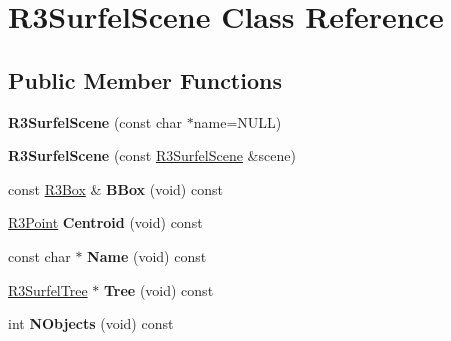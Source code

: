\hypertarget{class_r3_surfel_scene}{}\section{R3\+Surfel\+Scene Class Reference}
\label{class_r3_surfel_scene}
\subsection*{Public Member Functions}
\begin{DoxyCompactItemize}
\item 
{\bfseries R3\+Surfel\+Scene} (const char $\ast$name=N\+U\+LL)\hypertarget{class_r3_surfel_scene_a71cdf9f385093b44b2c3a752dd03eff1}{}\label{class_r3_surfel_scene_a71cdf9f385093b44b2c3a752dd03eff1}

\item 
{\bfseries R3\+Surfel\+Scene} (const \hyperlink{class_r3_surfel_scene}{R3\+Surfel\+Scene} \&scene)\hypertarget{class_r3_surfel_scene_a8f501256ddf0b017856d8916af9d0bcb}{}\label{class_r3_surfel_scene_a8f501256ddf0b017856d8916af9d0bcb}

\item 
const \hyperlink{class_r3_box}{R3\+Box} \& {\bfseries B\+Box} (void) const \hypertarget{class_r3_surfel_scene_aef52657a0cec8dbfd37fb4bb65a5a875}{}\label{class_r3_surfel_scene_aef52657a0cec8dbfd37fb4bb65a5a875}

\item 
\hyperlink{class_r3_point}{R3\+Point} {\bfseries Centroid} (void) const \hypertarget{class_r3_surfel_scene_a4047a286060f1531cd56978ff865f005}{}\label{class_r3_surfel_scene_a4047a286060f1531cd56978ff865f005}

\item 
const char $\ast$ {\bfseries Name} (void) const \hypertarget{class_r3_surfel_scene_ad9a826a9b2065410935a9834ea9b1639}{}\label{class_r3_surfel_scene_ad9a826a9b2065410935a9834ea9b1639}

\item 
\hyperlink{class_r3_surfel_tree}{R3\+Surfel\+Tree} $\ast$ {\bfseries Tree} (void) const \hypertarget{class_r3_surfel_scene_abfac6b3ecb73acacf331f03e9ae87102}{}\label{class_r3_surfel_scene_abfac6b3ecb73acacf331f03e9ae87102}

\item 
int {\bfseries N\+Objects} (void) const \hypertarget{class_r3_surfel_scene_a8acfa61b6a7c69ee48906d19d5d57159}{}\label{class_r3_surfel_scene_a8acfa61b6a7c69ee48906d19d5d57159}


\end{DoxyCompactItemize}

